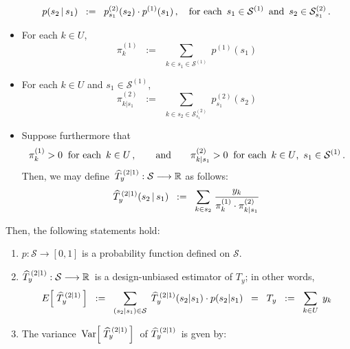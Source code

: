 \begin{theorem}
\begin{itemize}
\begin{equation*}
	p(s_{2}\,\vert\,s_{1}) \;\; := \;\; p^{(2)}_{s_{1}}(s_{2}) \cdot p^{(1)}(s_{1})\,,
	\quad
	\textnormal{for each \,$s_{1} \in \mathcal{S}^{(1)}$\, and \,$s_{2} \in \mathcal{S}^{(2)}_{s_{1}}$}\,.
	\end{equation*}
\item
	For each $k \in U$,
	\begin{equation*}
	\pi^{(1)}_{k} \;\; := \;\; \underset{k \in s_{1} \in \mathcal{S}^{(1)}}{\sum} \; p^{(1)}(s_{1})
	\end{equation*}
\item
	For each $k \in U$ and $s_{1} \in \mathcal{S}^{(1)}$,
	\begin{equation*}
	\pi^{(2)}_{k \vert s_{1}} \;\; := \;\; \underset{k \in s_{2} \in \mathcal{S}^{(2)}_{s_{1}}}{\sum} \; p^{(2)}_{s_{1}}(s_{2})
	\end{equation*}
\item
	Suppose furthermore that
	\begin{equation*}
	\pi^{(1)}_{k} > 0 \;\;\textnormal{for each \,$k \in U$}\,,
	\quad\quad\textnormal{and}\quad\quad
	\pi^{(2)}_{k \vert s_{1}} > 0 \;\;\textnormal{for each \,$k \in U$, \,$s_{1} \in \mathcal{S}^{(1)}$}\,.
	\end{equation*}
	Then, we may define \,$\widehat{T}^{\,(2 \vert 1)}_{y} : \mathcal{S} \longrightarrow \mathbb{R}$ as follows:
	\begin{equation*}
	\widehat{T}^{\,(2 \vert 1)}_{y}(s_{2}\,\vert\,s_{1})
	\;\; := \;\;
		\underset{k \in s_{2}}{\sum}\;\dfrac{y_{k}}{ \pi^{(1)}_{k} \cdot \pi^{(2)}_{k \vert s_{1}} }
	\end{equation*}
\end{itemize}
Then, the following statements hold:
\begin{enumerate}
\item
	$p : \mathcal{S} \longrightarrow [0,1]$ is a probability function defined on $\mathcal{S}$.
\item
	$\widehat{T}^{\,(2 \vert 1)}_{y} : \mathcal{S} \longrightarrow \mathbb{R}$\,
	is a design-unbiased estimator of $T_{y}$; in other words,
	\begin{equation*}
	E\!\left[\;\widehat{T}^{\,(2 \vert 1)}_{y}\,\right]
	\;\; := \;\;
		\underset{(s_{2} \vert s_{1})\in\mathcal{S}}{\sum}\;\,
		\widehat{T}^{\,(2 \vert 1)}_{y}(s_{2} \vert s_{1}) \cdot p(s_{2} \vert s_{1})
	\;\; = \;\;
		T_{y} \;\; := \;\; \underset{k \in U}{\sum}\;\, y_{k}
	\end{equation*}
\item
	The variance \,$\textnormal{Var}\!\left[\;\widehat{T}^{\,(2 \vert 1)}_{y}\,\right]$\, of
	\;$\widehat{T}^{\,(2 \vert 1)}_{y}$\, is gven by:

\end{enumerate}
\end{theorem}
